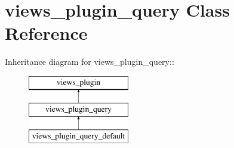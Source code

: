 \hypertarget{classviews__plugin__query}{
\section{views\_\-plugin\_\-query Class Reference}
\label{classviews__plugin__query}
}
Inheritance diagram for views\_\-plugin\_\-query::\begin{figure}[H]
\begin{center}
\leavevmode
\includegraphics[height=3cm]{classviews__plugin__query}
\end{center}
\end{figure}

